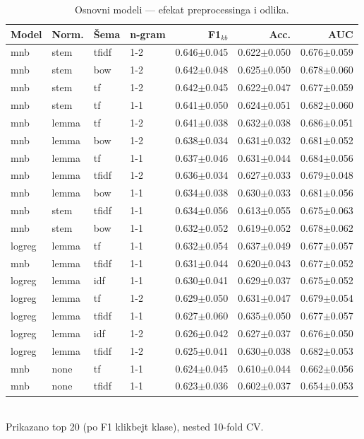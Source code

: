 \begin{table}[H]\centering
\caption{Osnovni modeli --- efekat preprocessinga i odlika.}\label{tab:baseline}
\begin{tabular}{llllrrr}
\toprule
Model & Norm. & Šema & n-gram & F1$_{kb}$ & Acc. & AUC \\
\midrule
mnb & stem & tfidf & 1-2 & 0.646$\pm$0.045 & 0.622$\pm$0.050 & 0.676$\pm$0.059 \\
mnb & stem & bow & 1-2 & 0.642$\pm$0.048 & 0.625$\pm$0.050 & 0.678$\pm$0.060 \\
mnb & stem & tf & 1-2 & 0.642$\pm$0.045 & 0.622$\pm$0.047 & 0.677$\pm$0.059 \\
mnb & stem & tf & 1-1 & 0.641$\pm$0.050 & 0.624$\pm$0.051 & 0.682$\pm$0.060 \\
mnb & lemma & tf & 1-2 & 0.641$\pm$0.038 & 0.632$\pm$0.038 & 0.686$\pm$0.051 \\
mnb & lemma & bow & 1-2 & 0.638$\pm$0.034 & 0.631$\pm$0.032 & 0.681$\pm$0.052 \\
mnb & lemma & tf & 1-1 & 0.637$\pm$0.046 & 0.631$\pm$0.044 & 0.684$\pm$0.056 \\
mnb & lemma & tfidf & 1-2 & 0.636$\pm$0.034 & 0.627$\pm$0.033 & 0.679$\pm$0.048 \\
mnb & lemma & bow & 1-1 & 0.634$\pm$0.038 & 0.630$\pm$0.033 & 0.681$\pm$0.056 \\
mnb & stem & tfidf & 1-1 & 0.634$\pm$0.056 & 0.613$\pm$0.055 & 0.675$\pm$0.063 \\
mnb & stem & bow & 1-1 & 0.632$\pm$0.052 & 0.619$\pm$0.052 & 0.678$\pm$0.062 \\
logreg & lemma & tf & 1-1 & 0.632$\pm$0.054 & 0.637$\pm$0.049 & 0.677$\pm$0.057 \\
mnb & lemma & tfidf & 1-1 & 0.631$\pm$0.044 & 0.620$\pm$0.043 & 0.677$\pm$0.052 \\
logreg & lemma & idf & 1-1 & 0.630$\pm$0.041 & 0.629$\pm$0.037 & 0.675$\pm$0.052 \\
logreg & lemma & tf & 1-2 & 0.629$\pm$0.050 & 0.631$\pm$0.047 & 0.679$\pm$0.054 \\
logreg & lemma & tfidf & 1-1 & 0.627$\pm$0.060 & 0.635$\pm$0.050 & 0.677$\pm$0.057 \\
logreg & lemma & idf & 1-2 & 0.626$\pm$0.042 & 0.627$\pm$0.037 & 0.676$\pm$0.050 \\
logreg & lemma & tfidf & 1-2 & 0.625$\pm$0.041 & 0.630$\pm$0.038 & 0.682$\pm$0.053 \\
mnb & none & tf & 1-1 & 0.624$\pm$0.045 & 0.610$\pm$0.044 & 0.662$\pm$0.056 \\
mnb & none & tfidf & 1-1 & 0.623$\pm$0.036 & 0.602$\pm$0.037 & 0.654$\pm$0.053 \\
\bottomrule
\end{tabular}
\\[2pt]\footnotesize Prikazano top 20 (po F1 klikbejt klase), nested 10-fold CV.
\end{table}
